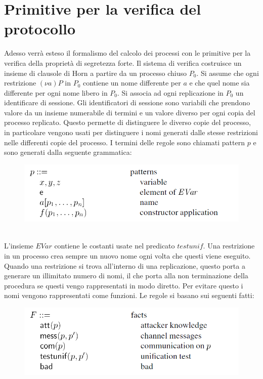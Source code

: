 \documentclass[12pt]{article}
\begin{document}
\section*{Primitive per la verifica del protocollo}
Adesso verrà esteso il formalismo del calcolo dei processi con le primitive per la verifica della proprietà di segretezza forte. Il sistema di verifica costruisce un insieme di clausole di Horn a partire da un processo chiuso $P_0$. Si assume che ogni restrizione $(\nu a)P$ in $P_0$ contiene un nome differente per $a$ e che quel nome sia differente per ogni nome libero in $P_0$. Si associa ad ogni replicazione in $P_0$ un identificare di sessione. Gli identificatori di sessione sono variabili che prendono valore da un insieme numerabile di termini e un valore diverso per ogni copia del processo replicato. Questo permette di distinguere le diverso copie del processo, in particolare vengono usati per distinguere i nomi generati dalle stesse restrizioni nelle differenti copie del processo. I termini delle regole sono chiamati pattern $p$ e sono generati dalla seguente grammatica:\\
\begin{figure}[h]
    \centering
    \includegraphics[scale=0.7]{Relazione/Immagini/rule.PNG}
\end{figure}\\
L'insieme $EVar$ contiene le costanti usate nel predicato $testunif$. Una restrizione in un processo crea sempre un nuovo nome ogni volta che questi viene eseguito. Quando una restrizione si trova all'interno di una replicazione, questo porta a generare un illimitato numero di nomi, il che porta alla non terminazione della procedura se questi vengo rappresentati in modo diretto. Per evitare questo i nomi vengono rappresentati come funzioni. Le regole si basano sui seguenti fatti:\\   
\begin{figure}[h]
    \centering
    \includegraphics[scale=0.7]{Relazione/Immagini/fatti.PNG}
\end{figure}\\
\end{document}
